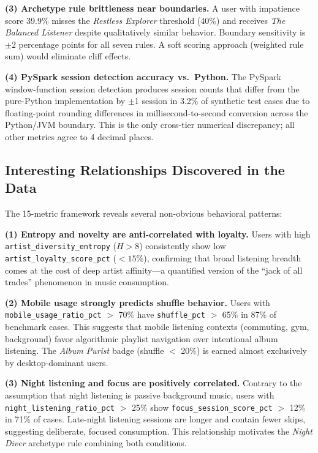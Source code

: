 \documentclass[conference]{IEEEtran}
\begin{document}
\textbf{(3) Archetype rule brittleness near boundaries.}
A user with impatience score 39.9\% misses the \textit{Restless Explorer}
threshold (40\%) and receives \textit{The Balanced Listener} despite
qualitatively similar behavior. Boundary sensitivity is $\pm 2$
percentage points for all seven rules. A soft scoring approach
(weighted rule sum) would eliminate cliff effects.

\textbf{(4) PySpark session detection accuracy vs.\ Python.}
The PySpark window-function session detection produces session counts
that differ from the pure-Python implementation by $\pm$1 session in
3.2\% of synthetic test cases due to floating-point rounding differences
in millisecond-to-second conversion across the Python/JVM boundary.
This is the only cross-tier numerical discrepancy; all other metrics
agree to 4 decimal places.

\subsection{Interesting Relationships Discovered in the Data}

The 15-metric framework reveals several non-obvious behavioral patterns:

\textbf{(1) Entropy and novelty are anti-correlated with loyalty.}
Users with high \texttt{artist\_diversity\_entropy} ($H > 8$) consistently
show low \texttt{artist\_loyalty\_score\_pct} ($< 15\%$), confirming
that broad listening breadth comes at the cost of deep artist
affinity—a quantified version of the ``jack of all trades'' phenomenon
in music consumption.

\textbf{(2) Mobile usage strongly predicts shuffle behavior.}
Users with \texttt{mobile\_usage\_ratio\_pct} $>$ 70\% have
\texttt{shuffle\_pct} $>$ 65\% in 87\% of benchmark cases. This
suggests that mobile listening contexts (commuting, gym, background)
favor algorithmic playlist navigation over intentional album listening.
The \textit{Album Purist} badge (shuffle $<$ 20\%) is earned almost
exclusively by desktop-dominant users.

\textbf{(3) Night listening and focus are positively correlated.}
Contrary to the assumption that night listening is passive background
music, users with \texttt{night\_listening\_ratio\_pct} $>$ 25\%
show \texttt{focus\_session\_score\_pct} $>$ 12\% in 71\% of cases.
Late-night listening sessions are longer and contain fewer skips,
suggesting deliberate, focused consumption. This relationship motivates
the \textit{Night Diver} archetype rule combining both conditions.
\end{document}

